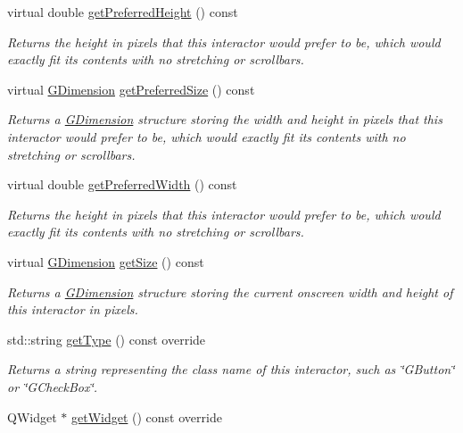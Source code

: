 \begin{DoxyCompactItemize}
virtual double \mbox{\hyperlink{classGInteractor_a747de0961653847bdc6615dbf756d715}{get\+Preferred\+Height}} () const
\begin{DoxyCompactList}\small\item\em Returns the height in pixels that this interactor would prefer to be, which would exactly fit its contents with no stretching or scrollbars. \end{DoxyCompactList}\item 
virtual \mbox{\hyperlink{structGDimension}{G\+Dimension}} \mbox{\hyperlink{classGInteractor_a4aabbee761d8e9116275401131b7ccd1}{get\+Preferred\+Size}} () const
\begin{DoxyCompactList}\small\item\em Returns a \mbox{\hyperlink{structGDimension}{G\+Dimension}} structure storing the width and height in pixels that this interactor would prefer to be, which would exactly fit its contents with no stretching or scrollbars. \end{DoxyCompactList}\item 
virtual double \mbox{\hyperlink{classGInteractor_a82bca31d37700fb0e35d2743352efd5e}{get\+Preferred\+Width}} () const
\begin{DoxyCompactList}\small\item\em Returns the height in pixels that this interactor would prefer to be, which would exactly fit its contents with no stretching or scrollbars. \end{DoxyCompactList}\item 
virtual \mbox{\hyperlink{structGDimension}{G\+Dimension}} \mbox{\hyperlink{classGInteractor_a7b4eec96a2bdc6420695d5796a78eea9}{get\+Size}} () const
\begin{DoxyCompactList}\small\item\em Returns a \mbox{\hyperlink{structGDimension}{G\+Dimension}} structure storing the current onscreen width and height of this interactor in pixels. \end{DoxyCompactList}\item 
std\+::string \mbox{\hyperlink{classGSpacer_a9b72ede4ee8520f987a0c01e30654814}{get\+Type}} () const override
\begin{DoxyCompactList}\small\item\em Returns a string representing the class name of this interactor, such as \char`\"{}\+G\+Button\char`\"{} or \char`\"{}\+G\+Check\+Box\char`\"{}. \end{DoxyCompactList}\item 
Q\+Widget $\ast$ \mbox{\hyperlink{classGSpacer_a3b33a602b31a6b809d020535a59db3b4}{get\+Widget}} () const override

\end{DoxyCompactItemize}
